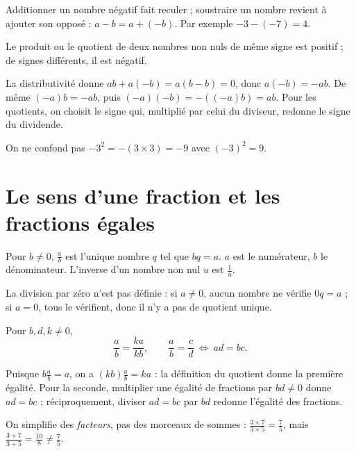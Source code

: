\documentclass[../cours_3e.tex]{subfiles}
\begin{document}
Additionner un nombre négatif fait reculer ; soustraire un nombre revient à ajouter son opposé : $a-b=a+(-b)$. Par exemple $-3-(-7)=4$.
\begin{propriete}
Le produit ou le quotient de deux nombres non nuls de même signe est positif ; de signes différents, il est négatif.
\end{propriete}
\begin{demonstration}
La distributivité donne $a b+a(-b)=a(b-b)=0$, donc $a(-b)=-ab$. De même $(-a)b=-ab$, puis $(-a)(-b)=-((-a)b)=ab$. Pour les quotients, on choisit le signe qui, multiplié par celui du diviseur, redonne le signe du dividende.
\end{demonstration}
On ne confond pas $-3^2=-(3\times3)=-9$ avec $(-3)^2=9$.

\section{Le sens d'une fraction et les fractions égales}
\begin{definition}
Pour $b\ne0$, $\frac ab$ est l'unique nombre $q$ tel que $bq=a$. $a$ est le numérateur, $b$ le dénominateur. L'inverse d'un nombre non nul $u$ est $\frac1u$.
\end{definition}
La division par zéro n'est pas définie : si $a\ne0$, aucun nombre ne vérifie $0q=a$ ; si $a=0$, tous le vérifient, donc il n'y a pas de quotient unique.
\begin{propriete}
Pour $b,d,k\ne0$,
\[\frac ab=\frac{ka}{kb},\qquad \frac ab=\frac cd\ \Longleftrightarrow\ ad=bc.\]
\end{propriete}
\begin{demonstration}
Puisque $b\frac ab=a$, on a $(kb)\frac ab=ka$ : la définition du quotient donne la première égalité. Pour la seconde, multiplier une égalité de fractions par $bd\ne0$ donne $ad=bc$ ; réciproquement, diviser $ad=bc$ par $bd$ redonne l'égalité des fractions.
\end{demonstration}
\begin{attention}
On simplifie des \emph{facteurs}, pas des morceaux de sommes : $\frac{3\times7}{3\times5}=\frac75$, mais $\frac{3+7}{3+5}=\frac{10}{8}\ne\frac75$.
\end{attention}
\end{document}

